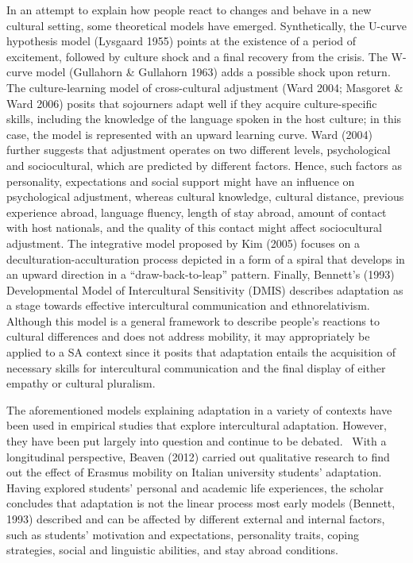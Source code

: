 \documentclass[12pt]{article}
\newenvironment{styleStandard}{\setlength\leftskip{0cm}\setlength\rightskip{0cm plus 1fil}\setlength\parindent{0cm}\setlength\parfillskip{0pt plus 1fil}\setlength\parskip{0in plus 1pt}\writerlistparindent\writerlistleftskip\leavevmode\normalfont\normalsize\writerlistlabel\ignorespaces}{\unskip\vspace{0.111in plus 0.0111in}\par}
\newcommand\writerlistleftskip{}
\newcommand\writerlistparindent{}
\newcommand\writerlistlabel{}
\begin{document}
\begin{styleStandard}
In an attempt to explain how people react to changes and behave in a new cultural setting, some theoretical models have emerged. Synthetically, the U-curve hypothesis model (Lysgaard 1955) points at the existence of a period of excitement, followed by culture shock and a final recovery from the crisis. The W-curve model (Gullahorn \& Gullahorn 1963) adds a possible shock upon return. The culture-learning model of cross-cultural adjustment (Ward 2004; Masgoret \& Ward 2006) posits that sojourners adapt well if they acquire culture-specific skills, including the knowledge of the language spoken in the host culture; in this case, the model is represented with an upward learning curve. Ward (2004) further suggests that adjustment operates on two different levels, psychological and sociocultural, which are predicted by different factors. Hence, such factors as personality, expectations and social support might have an influence on psychological adjustment, whereas cultural knowledge, cultural distance, previous experience abroad, language fluency, length of stay abroad, amount of contact with host nationals, and the quality of this contact might affect sociocultural adjustment. The integrative model proposed by Kim (2005) focuses on a deculturation-acculturation process depicted in a form of a spiral that develops in an upward direction in a “draw-back-to-leap” pattern. Finally, Bennett’s (1993) Developmental Model of Intercultural Sensitivity (DMIS) describes adaptation as a stage towards effective intercultural communication and ethnorelativism. Although this model is a general framework to describe people’s reactions to cultural differences and does not address mobility, it may appropriately be applied to a SA context since it posits that adaptation entails the acquisition of necessary skills for intercultural communication and the final display of either empathy or cultural pluralism.
\end{styleStandard}

\begin{styleStandard}
The aforementioned models explaining adaptation in a variety of contexts have been used in empirical studies that explore intercultural adaptation. However, they have been put largely into question and continue to be debated. \ With a longitudinal perspective, Beaven (2012) carried out qualitative research to find out the effect of Erasmus mobility on Italian university students’ adaptation. Having explored students’ personal and academic life experiences, the scholar concludes that adaptation is not the linear process most early models (Bennett, 1993) described and can be affected by different external and internal factors, such as students’ motivation and expectations, personality traits, coping strategies, social and linguistic abilities, and stay abroad conditions. 
\end{styleStandard}
\end{document}
